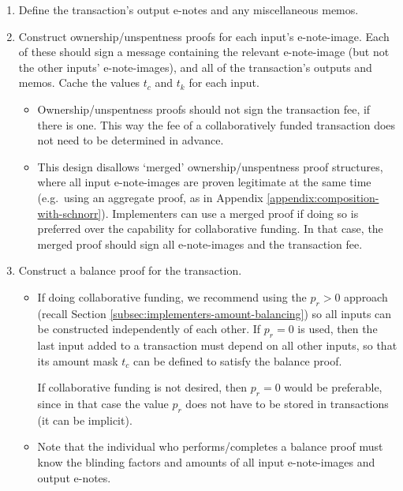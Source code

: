 \begin{enumerate}
    \item Define the transaction's output e-notes and any miscellaneous memos.

    \item Construct ownership/unspentness proofs for each input's e-note-image. Each of these should sign a message containing the relevant e-note-image (but not the other inputs' e-note-images), and all of the transaction's outputs and memos. Cache the values $t_c$ and $t_k$ for each input.

    \begin{itemize}
        \item Ownership/unspentness proofs should not sign the transaction fee, if there is one. This way the fee of a collaboratively funded transaction does not need to be determined in advance.

        \item This design disallows `merged' ownership/unspentness proof structures, where all input e-note-images are proven legitimate at the same time (e.g.\ using an aggregate proof, as in Appendix \ref{appendix:composition-with-schnorr}). Implementers can use a merged proof if doing so is preferred over the capability for collaborative funding. In that case, the merged proof should sign all e-note-images and the transaction fee.
    \end{itemize}

    \item Construct a balance proof for the transaction.

    \begin{itemize}
        \item If doing collaborative funding, we recommend using the $p_r > 0$ approach (recall Section \ref{subsec:implementers-amount-balancing}) so all inputs can be constructed independently of each other. If $p_r = 0$ is used, then the last input added to a transaction must depend on all other inputs, so that its amount mask $t_c$ can be defined to satisfy the balance proof.

        If collaborative funding is not desired, then $p_r = 0$ would be preferable, since in that case the value $p_r$ does not have to be stored in transactions (it can be implicit).

        \item Note that the individual who performs/completes a balance proof must know the blinding factors and amounts of all input e-note-images and output e-notes.
    \end{itemize}


\end{enumerate}
